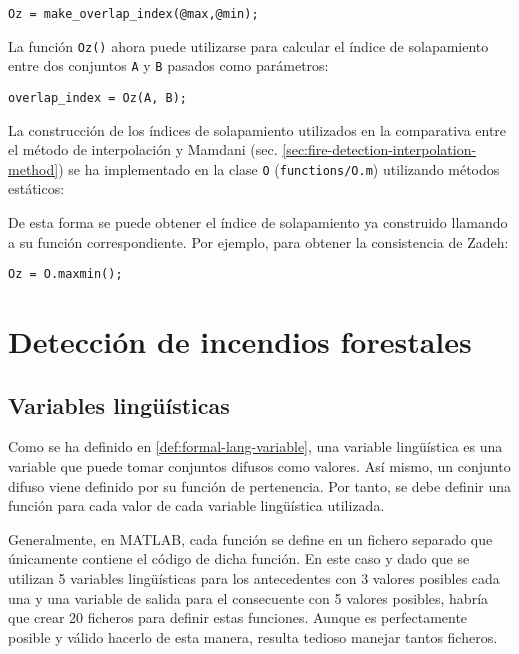 \begin{lstlisting}
Oz = make_overlap_index(@max,@min);
\end{lstlisting}

La función \lstinline|Oz()| ahora puede utilizarse para calcular el índice de solapamiento entre dos conjuntos \lstinline|A| y \lstinline|B| pasados como parámetros:

\begin{lstlisting}
overlap_index = Oz(A, B);
\end{lstlisting}
 
La construcción de los índices de solapamiento utilizados en la comparativa entre el método de interpolación y Mamdani (sec. \ref{sec:fire-detection-interpolation-method}) se ha implementado en la clase \lstinline|O| (\lstinline|functions/O.m|) utilizando métodos estáticos:



De esta forma se puede obtener el índice de solapamiento ya construido llamando a su función correspondiente. Por ejemplo, para obtener la consistencia de Zadeh:

\begin{lstlisting}
Oz = O.maxmin();
\end{lstlisting}
 
\section{Detección de incendios forestales}
\subsection{Variables lingüísticas}
Como se ha definido en \ref{def:formal-lang-variable}, una variable lingüística es una variable que puede tomar conjuntos difusos como valores. Así mismo, un conjunto difuso viene definido por su función de pertenencia. Por tanto, se debe definir una función para cada valor de cada variable lingüística utilizada. 

Generalmente, en MATLAB, cada función se define en un fichero separado que únicamente contiene el código de dicha función. En este caso y dado que se utilizan 5 variables lingüísticas para los antecedentes con 3 valores posibles cada una y una variable de salida para el consecuente con 5 valores posibles, habría que crear 20 ficheros para definir estas funciones. Aunque es perfectamente posible y válido hacerlo de esta manera, resulta tedioso manejar tantos ficheros. 

